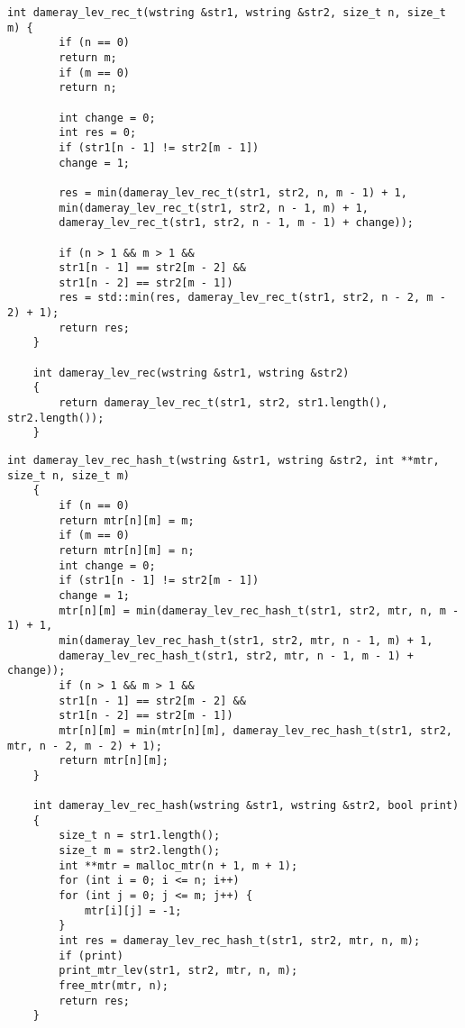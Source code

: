 \begin{lstlisting}[label=lst:dameray_lev_mtr,caption=Функция нахождения расстояния Дамерау-Левенштейна рекурсивно]
	int dameray_lev_rec_t(wstring &str1, wstring &str2, size_t n, size_t m) {
		if (n == 0)
		return m;
		if (m == 0)
		return n;
		
		int change = 0;
		int res = 0;
		if (str1[n - 1] != str2[m - 1])
		change = 1;
		
		res = min(dameray_lev_rec_t(str1, str2, n, m - 1) + 1,
		min(dameray_lev_rec_t(str1, str2, n - 1, m) + 1,
		dameray_lev_rec_t(str1, str2, n - 1, m - 1) + change));
		
		if (n > 1 && m > 1 &&
		str1[n - 1] == str2[m - 2] &&
		str1[n - 2] == str2[m - 1])
		res = std::min(res, dameray_lev_rec_t(str1, str2, n - 2, m - 2) + 1);
		return res;
	}
	
	int dameray_lev_rec(wstring &str1, wstring &str2)
	{
		return dameray_lev_rec_t(str1, str2, str1.length(), str2.length());
	}
\end{lstlisting}

\clearpage

\begin{lstlisting}[label=lst:dameray_lev_rec_hash,caption=Функция нахождения расстояния Дамерау-Левенштейна рекурсивно c кэшированием]
	int dameray_lev_rec_hash_t(wstring &str1, wstring &str2, int **mtr, size_t n, size_t m)
	{
		if (n == 0)
		return mtr[n][m] = m;
		if (m == 0)
		return mtr[n][m] = n;
		int change = 0;
		if (str1[n - 1] != str2[m - 1])
		change = 1;
		mtr[n][m] = min(dameray_lev_rec_hash_t(str1, str2, mtr, n, m - 1) + 1,
		min(dameray_lev_rec_hash_t(str1, str2, mtr, n - 1, m) + 1,
		dameray_lev_rec_hash_t(str1, str2, mtr, n - 1, m - 1) + change));
		if (n > 1 && m > 1 &&
		str1[n - 1] == str2[m - 2] &&
		str1[n - 2] == str2[m - 1])
		mtr[n][m] = min(mtr[n][m], dameray_lev_rec_hash_t(str1, str2, mtr, n - 2, m - 2) + 1);
		return mtr[n][m];
	}
	
	int dameray_lev_rec_hash(wstring &str1, wstring &str2, bool print)
	{
		size_t n = str1.length();
		size_t m = str2.length();
		int **mtr = malloc_mtr(n + 1, m + 1);
		for (int i = 0; i <= n; i++)
		for (int j = 0; j <= m; j++) {
			mtr[i][j] = -1;
		}
		int res = dameray_lev_rec_hash_t(str1, str2, mtr, n, m);
		if (print)
		print_mtr_lev(str1, str2, mtr, n, m);
		free_mtr(mtr, n);
		return res;
	}
\end{lstlisting}

\clearpage

